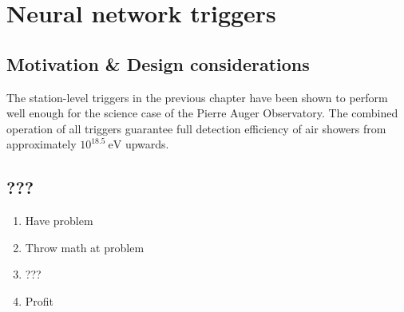 
\chapter{Neural network triggers}
\label{chap:neural-network-triggers}

\section{Motivation \& Design considerations}
\label{sec:motivation}

The station-level triggers in the previous chapter have been shown to perform well enough for the science case of the Pierre Auger Observatory. The combined 
operation of all triggers guarantee full detection efficiency of air showers from approximately $10^{18.5}\SI{}{\electronvolt}$ upwards.

\section{???}

\begin{enumerate}
    \item Have problem
    \item Throw math at problem
    \item ???
    \item Profit
\end{enumerate}

